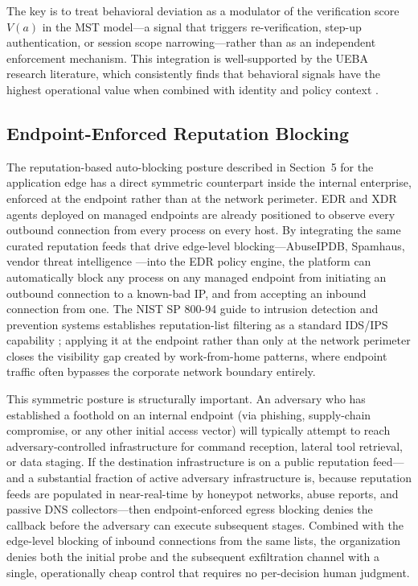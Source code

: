 \documentclass[unnumsec,webpdf,contemporary,large]{oup-authoring-template}
\theoremstyle{thmstyleone}
\theoremstyle{thmstyletwo}
\theoremstyle{thmstylethree}
\begin{document}
The key is to treat behavioral deviation as a modulator of the verification score $V(a)$
in the MST model---a signal that triggers re-verification, step-up authentication, or
session scope narrowing---rather than as an independent enforcement mechanism. This
integration is well-supported by the UEBA research literature, which consistently finds
that behavioral signals have the highest operational value when combined with
identity and policy context \cite{tuor2017}.

\subsection{Endpoint-Enforced Reputation Blocking}

The reputation-based auto-blocking posture described in Section~5 for the application
edge has a direct symmetric counterpart inside the internal enterprise, enforced at the
endpoint rather than at the network perimeter. EDR and XDR agents deployed on managed
endpoints are already positioned to observe every outbound connection from every
process on every host. By integrating the same curated reputation feeds that drive
edge-level blocking---AbuseIPDB, Spamhaus, vendor threat intelligence
\cite{abuseipdb2024, spamhaus2024}---into the EDR policy engine, the platform can
automatically block any process on any managed endpoint from initiating an outbound
connection to a known-bad IP, and from accepting an inbound connection from one.
The NIST SP 800-94 guide to intrusion detection and prevention systems establishes
reputation-list filtering as a standard IDS/IPS capability \cite{scarfone2007};
applying it at the endpoint rather than only at the network perimeter closes the
visibility gap created by work-from-home patterns, where endpoint traffic often
bypasses the corporate network boundary entirely.

This symmetric posture is structurally important. An adversary who has established
a foothold on an internal endpoint (via phishing, supply-chain compromise, or any
other initial access vector) will typically attempt to reach adversary-controlled
infrastructure for command reception, lateral tool retrieval, or data staging. If
the destination infrastructure is on a public reputation feed---and a substantial
fraction of active adversary infrastructure is, because reputation feeds are
populated in near-real-time by honeypot networks, abuse reports, and passive DNS
collectors---then endpoint-enforced egress blocking denies the callback before
the adversary can execute subsequent stages. Combined with the edge-level blocking
of inbound connections from the same lists, the organization denies both the
initial probe and the subsequent exfiltration channel with a single, operationally
cheap control that requires no per-decision human judgment.
\end{document}
